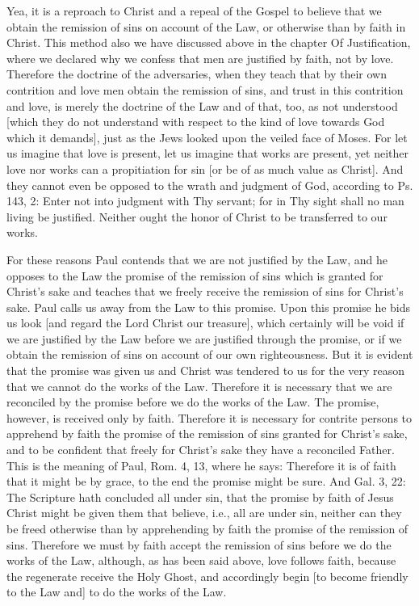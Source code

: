 Yea, it is a reproach to Christ and a repeal of the Gospel to believe
that we obtain the remission of sins on account of the Law, or
otherwise than by faith in Christ.  This method also we have
discussed above in the chapter Of Justification, where we declared
why we confess that men are justified by faith, not by love.
Therefore the doctrine of the adversaries, when they teach that by
their own contrition and love men obtain the remission of sins, and
trust in this contrition and love, is merely the doctrine of the Law
and of that, too, as not understood [which they do not understand
with respect to the kind of love towards God which it demands], just
as the Jews looked upon the veiled face of Moses.  For let us imagine
that love is present, let us imagine that works are present, yet
neither love nor works can a propitiation for sin [or be of as much
value as Christ].  And they cannot even be opposed to the wrath and
judgment of God, according to Ps. 143, 2: Enter not into judgment
with Thy servant; for in Thy sight shall no man living be justified.
Neither ought the honor of Christ to be transferred to our works.

For these reasons Paul contends that we are not justified by the Law,
and he opposes to the Law the promise of the remission of sins which
is granted for Christ's sake and teaches that we freely receive the
remission of sins for Christ's sake.  Paul calls us away from the Law
to this promise.  Upon this promise he bids us look [and regard the
Lord Christ our treasure], which certainly will be void if we are
justified by the Law before we are justified through the promise, or
if we obtain the remission of sins on account of our own
righteousness.  But it is evident that the promise was given us and
Christ was tendered to us for the very reason that we cannot do the
works of the Law.  Therefore it is necessary that we are reconciled
by the promise before we do the works of the Law.  The promise,
however, is received only by faith.  Therefore it is necessary for
contrite persons to apprehend by faith the promise of the remission
of sins granted for Christ's sake, and to be confident that freely
for Christ's sake they have a reconciled Father.  This is the meaning
of Paul, Rom. 4, 13, where he says: Therefore it is of faith that it
might be by grace, to the end the promise might be sure.  And Gal. 3,
22: The Scripture hath concluded all under sin, that the promise by
faith of Jesus Christ might be given them that believe, i.e., all are
under sin, neither can they be freed otherwise than by apprehending
by faith the promise of the remission of sins.  Therefore we must by
faith accept the remission of sins before we do the works of the Law,
although, as has been said above, love follows faith, because the
regenerate receive the Holy Ghost, and accordingly begin [to become
friendly to the Law and] to do the works of the Law.

